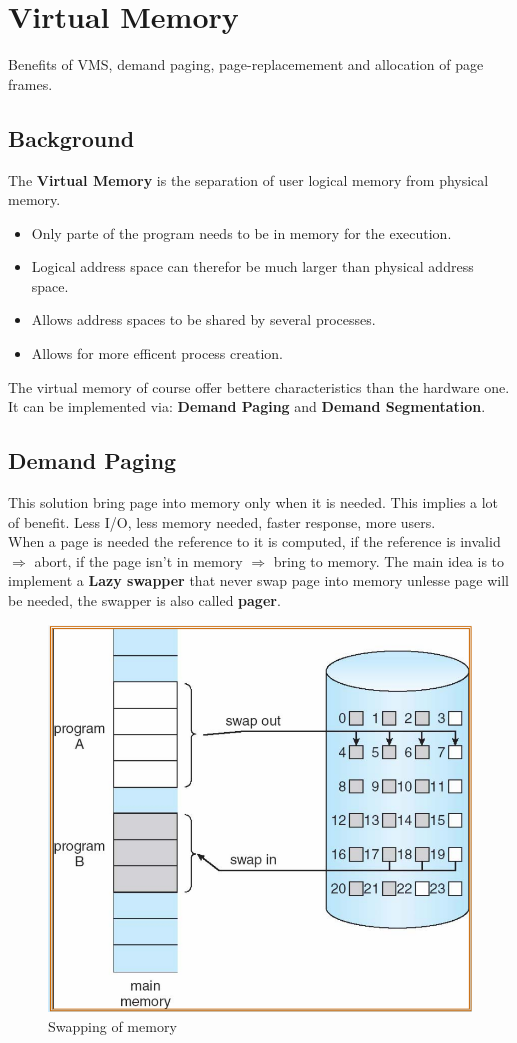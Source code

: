 \documentclass[12pt]{article}
\begin{document}
\section{Virtual Memory}
Benefits of VMS, demand paging, page-replacemement and allocation of page frames.

\subsection{Background}
The \textbf{Virtual Memory} is the separation of user logical memory from physical memory.
\begin{itemize}
  \item Only parte of the program needs to be in memory for the execution.
  \item Logical address space can therefor be much larger than physical address space.
  \item Allows address spaces to be shared by several processes.
  \item Allows for more efficent process creation.
\end{itemize}
The virtual memory of course offer bettere characteristics than the hardware one. It can be implemented via: \textbf{Demand Paging} and \textbf{Demand Segmentation}.

\subsection{Demand Paging}
This solution bring page into memory only when it is needed. This implies a lot of benefit. Less I/O, less memory needed, faster response, more users.\\
When a page is needed the reference to it is computed, if the reference is invalid $\Rightarrow$ abort, if the page isn't in memory $\Rightarrow$ bring to memory. The main idea is to implement a \textbf{Lazy swapper} that never swap page into memory unlesse page will be needed, the swapper is also called \textbf{pager}.
\begin{figure}[h]
  \centering
  \includegraphics[width=0.8\linewidth]{images/swapping.png}
  \caption{Swapping of memory}
  \label{fig:swapping}
\end{figure}
\end{document}
